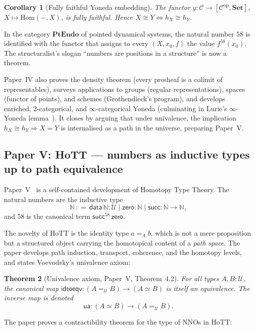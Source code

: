 \documentclass[12pt]{article}
\newtheorem{theorem}{Theorem}[section]
\newtheorem{corollary}[theorem]{Corollary}
\theoremstyle{definition}
\theoremstyle{remark}
\newcommand{\N}{\mathbb{N}}
\newcommand{\Set}{\mathbf{Set}}
\newcommand{\PtEndo}{\mathbf{PtEndo}}
\newcommand{\U}{\mathcal{U}}
\newcommand{\op}{^{\mathrm{op}}}
\newcommand{\Hom}{\mathrm{Hom}}
\newcommand{\zero}{\mathsf{zero}}
\newcommand{\suc}{\mathsf{succ}}
\newcommand{\ua}{\mathsf{ua}}
\newcommand{\idtoeqv}{\mathsf{idtoeqv}}
\newcommand{\eqv}{\simeq}
\newcommand{\iso}{\cong}
\begin{document}
\begin{corollary}[Fully faithful Yoneda embedding]
The functor $y\colon \mathcal{C} \to [\mathcal{C}\op, \Set]$,
$X \mapsto \Hom(-, X)$, is fully faithful. Hence
$X \iso Y \iff h_X \iso h_Y$.
\end{corollary}

In the category $\PtEndo$ of pointed dynamical systems, the natural number
$58$ is identified with the functor that assigns to every
$(X, x_0, f)$ the value $f^{58}(x_0)$. The structuralist's slogan
``numbers are positions in a structure'' is now a theorem.

Paper~IV also proves the density theorem (every presheaf is a colimit of
representables), surveys applications to groups (regular representations),
spaces (functor of points), and schemes (Grothendieck's program), and
develops enriched, $2$-categorical, and $\infty$-categorical Yoneda
(culminating in Lurie's $\infty$-Yoneda lemma~\cite{lurie}). It closes by
arguing that under univalence, the implication
$h_X \iso h_Y \Rightarrow X = Y$ is internalised as a path in the universe,
preparing Paper~V.

\subsection{Paper V: HoTT --- numbers as inductive types up to path equivalence}
\label{sec:row-v}

Paper~V~\cite{paper-v} is a self-contained development of Homotopy Type
Theory. The natural numbers are the inductive type
\[
\N \,:\!\!=\, \mathsf{data}\, \N : \U \;|\; \zero : \N \;|\; \suc : \N \to \N,
\]
and $58$ is the canonical term $\suc^{58}\,\zero$.

The novelty of HoTT is the identity type $a =_A b$, which is not a mere
proposition but a structured object carrying the homotopical content of a
\emph{path space}. The paper develops path induction, transport, coherence,
and the homotopy levels, and states Voevodsky's univalence axiom:

\begin{theorem}[Univalence axiom, Paper~V, Theorem~4.2]
\label{thm:univalence}
For all types $A, B : \U$, the canonical map
$\idtoeqv\colon (A =_\U B) \to (A \eqv B)$ is itself an equivalence. The
inverse map is denoted
\[
\ua\colon (A \eqv B) \to (A =_\U B).
\]
\end{theorem}

The paper proves a contractibility theorem for the type of NNOs in HoTT:
\end{document}
